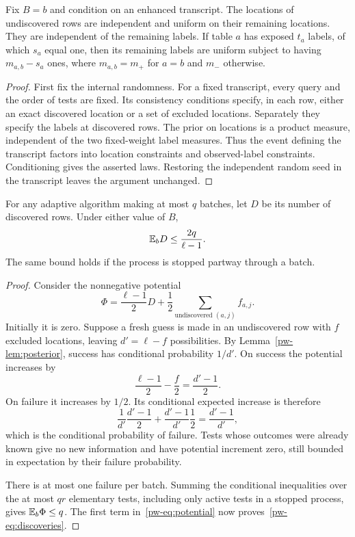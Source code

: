 \begin{lemma}\label{pw-lem:posterior}
Fix $B=b$ and condition on an enhanced transcript. The locations of undiscovered rows are independent and uniform on their remaining locations. They are independent of the remaining labels. If table $a$ has exposed $t_a$ labels, of which $s_a$ equal one, then its remaining labels are uniform subject to having $m_{a,b}-s_a$ ones, where $m_{a,b}=m_+$ for $a=b$ and $m_-$ otherwise.
\end{lemma}
\begin{proof}
First fix the internal randomness. For a fixed transcript, every query and the order of tests are fixed. Its consistency conditions specify, in each row, either an exact discovered location or a set of excluded locations. Separately they specify the labels at discovered rows. The prior on locations is a product measure, independent of the two fixed-weight label measures. Thus the event defining the transcript factors into location constraints and observed-label constraints. Conditioning gives the asserted laws. Restoring the independent random seed in the transcript leaves the argument unchanged.
\end{proof}

\begin{lemma}\label{pw-lem:search}
For any adaptive algorithm making at most $q$ batches, let $D$ be its number of discovered rows. Under either value of $B$,
\begin{equation}\label{pw-eq:discoveries}
\mathbb E_b D\le\frac{2q}{\ell-1}.
\end{equation}
The same bound holds if the process is stopped partway through a batch.
\end{lemma}
\begin{proof}
Consider the nonnegative potential
\begin{equation}\label{pw-eq:potential}
\Phi=\frac{\ell-1}{2}D+
\frac12\sum_{\text{undiscovered }(a,j)}f_{a,j}.
\end{equation}
Initially it is zero. Suppose a fresh guess is made in an undiscovered row with $f$ excluded locations, leaving $d'=\ell-f$ possibilities. By Lemma~\ref{pw-lem:posterior}, success has conditional probability $1/d'$. On success the potential increases by
\[
\frac{\ell-1}{2}-\frac f2=\frac{d'-1}{2}.
\]
On failure it increases by $1/2$. Its conditional expected increase is therefore
\[
\frac1{d'}\frac{d'-1}{2}
+\frac{d'-1}{d'}\frac12
=\frac{d'-1}{d'},
\]
which is the conditional probability of failure. Tests whose outcomes were already known give no new information and have potential increment zero, still bounded in expectation by their failure probability.

There is at most one failure per batch. Summing the conditional inequalities over the at most $qr$ elementary tests, including only active tests in a stopped process, gives $\mathbb E_b\Phi\le q$. The first term in~\eqref{pw-eq:potential} now proves~\eqref{pw-eq:discoveries}.
\end{proof}

